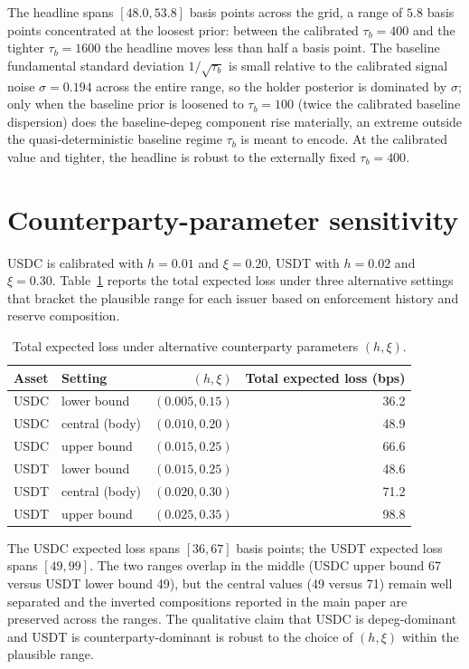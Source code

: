 The headline spans $[48.0, 53.8]$ basis points across the grid, a range of $5.8$ basis points concentrated at the loosest prior: between the calibrated $\tau_b = 400$ and the tighter $\tau_b = 1600$ the headline moves less than half a basis point. The baseline fundamental standard deviation $1/\sqrt{\tau_b}$ is small relative to the calibrated signal noise $\sigma = 0.194$ across the entire range, so the holder posterior is dominated by $\sigma$; only when the baseline prior is loosened to $\tau_b = 100$ (twice the calibrated baseline dispersion) does the baseline-depeg component rise materially, an extreme outside the quasi-deterministic baseline regime $\tau_b$ is meant to encode. At the calibrated value and tighter, the headline is robust to the externally fixed $\tau_b = 400$.

\section{Counterparty-parameter sensitivity}\label{sub:sens_counterparty}

USDC is calibrated with $h = 0.01$ and $\xi = 0.20$, USDT with $h = 0.02$ and $\xi = 0.30$. Table~\ref{tab:sens_counterparty} reports the total expected loss under three alternative settings that bracket the plausible range for each issuer based on enforcement history and reserve composition.

\begin{table}[H]
\centering
\caption{Total expected loss under alternative counterparty parameters $(h, \xi)$.}\label{tab:sens_counterparty}
\begin{tabular}{llrr}
\toprule
Asset & Setting & $(h, \xi)$ & Total expected loss (bps) \\
\midrule
USDC & lower bound       & $(0.005, 0.15)$ & 36.2 \\
USDC & central (body)    & $(0.010, 0.20)$ & 48.9 \\
USDC & upper bound       & $(0.015, 0.25)$ & 66.6 \\
\midrule
USDT & lower bound       & $(0.015, 0.25)$ & 48.6 \\
USDT & central (body)    & $(0.020, 0.30)$ & 71.2 \\
USDT & upper bound       & $(0.025, 0.35)$ & 98.8 \\
\bottomrule
\end{tabular}
\end{table}

The USDC expected loss spans $[36, 67]$ basis points; the USDT expected loss spans $[49, 99]$. The two ranges overlap in the middle (USDC upper bound 67 versus USDT lower bound 49), but the central values (49 versus 71) remain well separated and the inverted compositions reported in the main paper are preserved across the ranges. The qualitative claim that USDC is depeg-dominant and USDT is counterparty-dominant is robust to the choice of $(h, \xi)$ within the plausible range.

